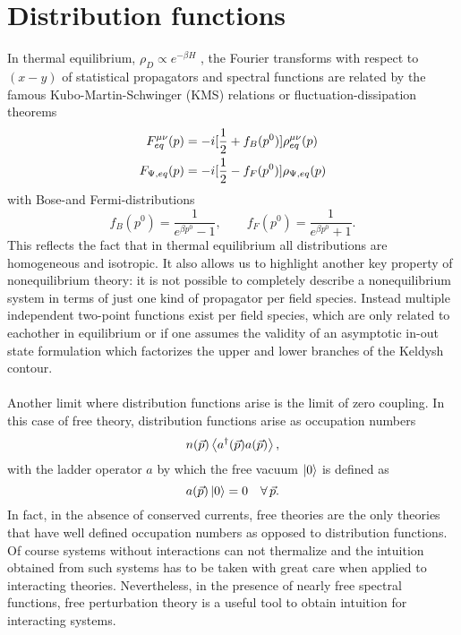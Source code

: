 \section{Distribution functions}
In thermal equilibrium, $\rho_D \propto e^{−\beta H}$ , the
Fourier transforms with respect to $(x − y)$ of statistical propagators and spectral functions are related by
the famous Kubo-Martin-Schwinger (KMS) relations or fluctuation-dissipation theorems
\begin{align}
	F^{\mu\nu}_{eq}(p) &= -i [\frac{1}{2} +f_B(p^0)]\rho^{\mu\nu}_{eq}(p) \\
	F_{\Psi,eq} (p) &= -i[\frac{1}{2} - f_F(p^0)]\rho_{\Psi,eq}(p)
\end{align}
with Bose-and Fermi-distributions
\begin{equation}
	f_B(p^0) = \frac{1}{e^{\beta p^0} -1},\qquad f_F (p^0)= \frac{1}{e^{\beta p^0}+1}.
\end{equation}
This reflects the fact that in thermal equilibrium all distributions are homogeneous and isotropic. It also
allows us to highlight another key property of nonequilibrium theory: it is not possible to completely
describe a nonequilibrium system in terms of just one kind of propagator per field species. Instead multiple
independent two-point functions exist per field species, which are only related to eachother in equilibrium
or if one assumes the validity of an asymptotic in-out state formulation which factorizes the upper and
lower branches of the Keldysh contour.\\
\\
Another limit where distribution functions arise is the limit of zero coupling. In this case of free
theory, distribution functions arise as occupation numbers
\begin{equation}
	n(\vec{p}) \expval{a^\dagger(\vec{p}) a(\vec{p})},
\end{equation}
with the ladder operator $a$ by which the free vacuum $\ket{0}$ is defined as
\begin{equation}
	a(\vec{p})\ket{0} =0 \quad \forall \, \vec{p}.
\end{equation}
In fact, in the absence of conserved currents, free theories are the only theories that have well defined
occupation numbers as opposed to distribution functions. Of course systems without interactions can not
thermalize and the intuition obtained from such systems has to be taken with great care when applied
to interacting theories. Nevertheless, in the presence of nearly free spectral functions, free perturbation
theory is a useful tool to obtain intuition for interacting systems.




